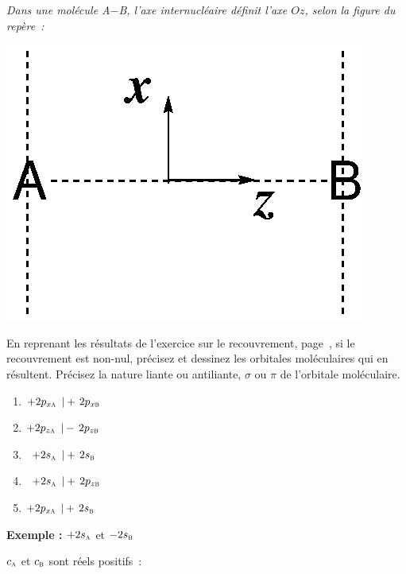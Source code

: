 
\parbox{0.5\textwidth}{\textit{Dans une mol\'ecule A$-$B, l'axe internucl\'eaire 
d\'efinit l'axe $Oz$, selon la figure du rep\`ere~:}}
\parbox{0.5\textwidth}{\centerline{\includegraphics[scale=0.4]{figure/AB_repere.eps}}}

En reprenant les r\'esultats de l'exercice sur le recouvrement, page~\pageref{exo_s}, 
si le recouvrement est non-nul, pr\'ecisez et dessinez les
orbitales mol\'eculaires qui en r\'esultent. Pr\'ecisez la nature
liante ou antiliante, $\sigma$ ou $\pi$ de l'orbitale mol\'eculaire.

\vspace{0.3cm}

\begin{enumerate}[\bf 1)]
\item $+2p_{x\textsc{a}}\ \, |+\,2p_{x\textsc{b}}$
\item $+2p_{z\textsc{a}}\ \, |-\,2p_{z\textsc{b}}$
\item $\ \, +2s_\textsc{a}\ \, |+\,2s_\textsc{b}$
\item $\ \, +2s_\textsc{a}\ \, |+\,2p_{z\textsc{b}}$
\item $+2p_{x\textsc{a}}\ \, |+\,2s_\textsc{b}$
\end{enumerate}

\vspace{0.3cm}

\textbf{Exemple :}  $+2s_\textsc{a}$ et $-2s_\textsc{b}$

$c_\textsc{a}$ et $c_\textsc{b}$ sont r\'eels positifs~:

